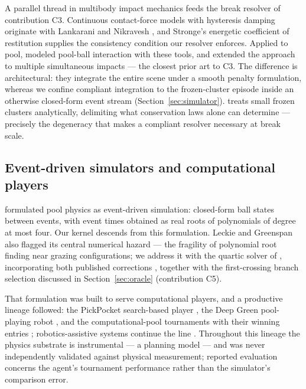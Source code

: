 A parallel thread in multibody impact mechanics feeds the break resolver
of contribution C3. Continuous contact-force models with hysteresis
damping originate with Lankarani and Nikravesh
\citep{lankarani1990contact,lankarani1994continuous}, and Stronge's
energetic coefficient of restitution \citep{stronge2018impact} supplies
the consistency condition our resolver enforces. Applied to pool,
\citet{corral2020poolballs} modeled pool-ball interaction with these
tools, and \citet{gismerosmoreno2022multiple} extended the approach to
multiple simultaneous impacts --- the closest prior art to C3. The
difference is architectural: they integrate the entire scene under a
smooth penalty formulation, whereas we confine compliant integration to
the frozen-cluster episode inside an otherwise closed-form event stream
(Section~\ref{sec:simulator}). \citet{cross2023oblique} treats small
frozen clusters analytically, delimiting what conservation laws alone can
determine --- precisely the degeneracy that makes a compliant resolver
necessary at break scale.

\subsection{Event-driven simulators and computational players}

\citet{leckie2006event} formulated pool physics as event-driven
simulation: closed-form ball states between events, with event times
obtained as real roots of polynomials of degree at most four. Our kernel
descends from this formulation. Leckie and Greenspan also flagged its
central numerical hazard --- the fragility of polynomial root finding near
grazing configurations; we address it with the quartic solver of
\citet{orellana2020algorithm1010}, incorporating both published
corrections \citep{demichele2022remark,demichele2024remark}, together with
the first-crossing branch selection discussed in Section~\ref{sec:oracle}
(contribution C5).

That formulation was built to serve computational players, and a
productive lineage followed: the PickPocket search-based player
\citep{smith2007pickpocket}, the Deep Green pool-playing robot
\citep{greenspan2008toward}, and the computational-pool tournaments with
their winning entries \citep{archibald2009analysis,%
archibald2010computational,archibald2016distributed};
robotics-assistive systems continue the line \citep{park2022carom}.
Throughout this lineage the physics substrate is instrumental --- a
planning model --- and was never independently validated against physical
measurement; reported evaluation concerns the agent's tournament
performance rather than the simulator's comparison error.

